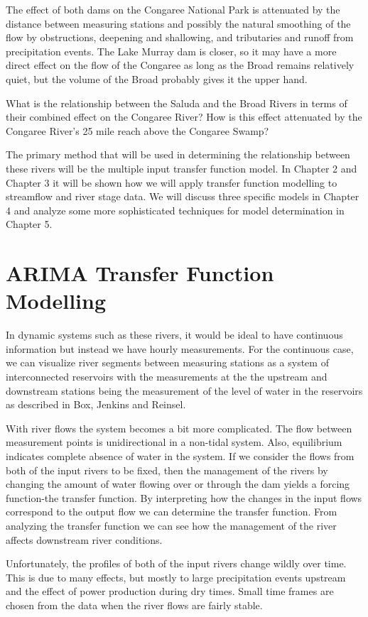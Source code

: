 \documentclass[12pt]{report}
\begin{document}
The effect of both dams on the Congaree National Park is
attenuated by the distance between measuring stations and possibly
the natural smoothing of the flow by obstructions, deepening and
shallowing, and tributaries and runoff from precipitation events.
The Lake Murray dam is closer, so it may have a more direct effect
on the flow of the Congaree as long as the Broad remains
relatively quiet, but the volume of the Broad probably gives it
the upper hand.

What is the relationship between the Saluda and the Broad Rivers
in terms of their combined effect on the Congaree River?  How is
this effect attenuated by the Congaree River's 25 mile reach above
the Congaree Swamp?

The primary method that will be used in determining the
relationship between these rivers will be the multiple input
transfer function model.  In Chapter 2 and Chapter 3 it will be
shown how we will apply transfer function modelling to streamflow
and river stage data.  We will discuss three specific models in
Chapter 4 and analyze some more sophisticated techniques for model
determination in Chapter 5.

\chapter{ARIMA Transfer Function Modelling}
In dynamic systems such as these rivers, it would be ideal to have
continuous information but instead we have hourly measurements.
For the continuous case, we can visualize river segments between
measuring stations as a system of interconnected reservoirs with
the measurements at the the upstream and downstream stations being
the measurement of the level of water in the reservoirs as
described in Box, Jenkins and Reinsel.

With river flows the system becomes a bit more complicated.  The
flow between measurement points is unidirectional in a non-tidal
system.  Also, equilibrium indicates complete absence of water in
the system.  If we consider the flows from both of the input
rivers to be fixed, then the management of the rivers by changing
the amount of water flowing over or through the dam yields a
forcing function-the transfer function. By interpreting how the
changes in the input flows correspond to the output flow we can
determine the transfer function.  From analyzing the transfer
function we can see how the management of the river affects
downstream river conditions.

Unfortunately, the profiles of both of the input rivers change
wildly over time.  This is due to many effects, but mostly to
large precipitation events upstream and the effect of power
production during dry times.  Small time frames are chosen from
the data when the river flows are fairly stable.
\end{document}
